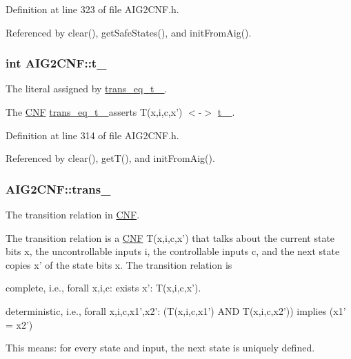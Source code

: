 Definition at line 323 of file A\-I\-G2\-C\-N\-F.\-h.



Referenced by clear(), get\-Safe\-States(), and init\-From\-Aig().

\hypertarget{classAIG2CNF_af2a7f6ecdcec3b5b2f37a11b0adde65a}{
\subsubsection[{t\-\_\-}]{\setlength{\rightskip}{0pt plus 5cm}int A\-I\-G2\-C\-N\-F\-::t\-\_\-\hspace{0.3cm}{\ttfamily [protected]}}}\label{classAIG2CNF_af2a7f6ecdcec3b5b2f37a11b0adde65a}


The literal assigned by \hyperlink{classAIG2CNF_af7e9b65092f626865a4aa541a48e4f1b}{trans\-\_\-eq\-\_\-t\-\_\- }. 

The \hyperlink{classCNF}{C\-N\-F} \hyperlink{classAIG2CNF_af7e9b65092f626865a4aa541a48e4f1b}{trans\-\_\-eq\-\_\-t\-\_\- } asserts T(x,i,c,x') $<$-\/$>$ \hyperlink{classAIG2CNF_af2a7f6ecdcec3b5b2f37a11b0adde65a}{t\-\_\- }. 

Definition at line 314 of file A\-I\-G2\-C\-N\-F.\-h.



Referenced by clear(), get\-T(), and init\-From\-Aig().

\hypertarget{classAIG2CNF_aedcb9a8efe69fe03721fdc17c5d11bfc}{
\subsubsection[{trans\-\_\-}]{ A\-I\-G2\-C\-N\-F\-::trans\-\_\-\hspace{0.3cm}{\ttfamily [protected]}}}\label{classAIG2CNF_aedcb9a8efe69fe03721fdc17c5d11bfc}


The transition relation in \hyperlink{classCNF}{C\-N\-F}. 

The transition relation is a \hyperlink{classCNF}{C\-N\-F} T(x,i,c,x') that talks about the current state bits x, the uncontrollable inputs i, the controllable inputs c, and the next state copies x' of the state bits x. The transition relation is 
\begin{DoxyItemize}
\item complete, i.\-e., forall x,i,c\-: exists x'\-: T(x,i,c,x'). 
\item deterministic, i.\-e., forall x,i,c,x1',x2'\-: (T(x,i,c,x1') A\-N\-D T(x,i,c,x2')) implies (x1' = x2') 
\end{DoxyItemize}This means\-: for every state and input, the next state is uniquely defined. 

